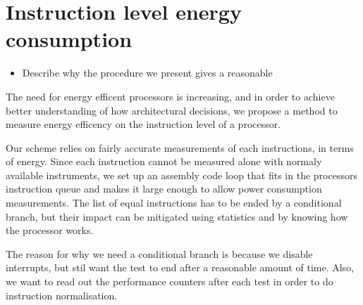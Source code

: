 \section{Instruction level energy consumption}

\begin{itemize}
    \item Describe why the procedure we present gives a reasonable
\end{itemize}


The need for energy efficent processors is increasing, and in order to achieve
better understanding of how architectural decisions, we propose a method to
measure energy efficency on the instruction level of a processor.

Our scheme relies on fairly accurate measurements of each instructions, in terms
of energy. Since each instruction cannot be measured alone with normaly
available instruments, we set up an assembly code loop that fits in the
processors instruction queue and makes it large enough to allow power
consumption measurements. The list of equal instructions has to be ended by
a conditional branch, but their impact can be mitigated using
statistics and by knowing how the processor works.

The reason for why we need a conditional branch is because we disable
interrupts, but stil want the test to end after a reasonable amount of time.
Also, we want to read out the performance counters after each test in order to
do instruction normalisation.


